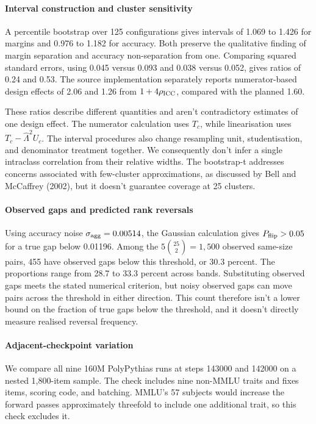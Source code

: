 \paragraph{Interval construction and cluster sensitivity}
A percentile bootstrap over 125 configurations gives intervals of 1.069 to 1.426 for margins and 0.976 to 1.182 for accuracy. Both preserve the qualitative finding of margin separation and accuracy non-separation from one. Comparing squared standard errors, using 0.045 versus 0.093 and 0.038 versus 0.052, gives ratios of 0.24 and 0.53. The source implementation separately reports numerator-based design effects of 2.06 and 1.26 from $1+4\rho_{\rm ICC}$, compared with the planned 1.60.

These ratios describe different quantities and aren't contradictory estimates of one design effect. The numerator calculation uses $T_c$, while linearisation uses $T_c-\widehat\Lambda^2U_c$. The interval procedures also change resampling unit, studentisation, and denominator treatment together. We consequently don't infer a single intraclass correlation from their relative widths. The bootstrap-t addresses concerns associated with few-cluster approximations, as discussed by Bell and McCaffrey (2002), but it doesn't guarantee coverage at 25 clusters.

\paragraph{Observed gaps and predicted rank reversals}
Using accuracy noise $\sigma_{\rm agg}=0.00514$, the Gaussian calculation gives $P_{\rm flip}>0.05$ for a true gap below 0.01196. Among the $5\binom{25}{2}=1{,}500$ observed same-size pairs, 455 have observed gaps below this threshold, or 30.3 percent. The proportions range from 28.7 to 33.3 percent across bands. Substituting observed gaps meets the stated numerical criterion, but noisy observed gaps can move pairs across the threshold in either direction. This count therefore isn't a lower bound on the fraction of true gaps below the threshold, and it doesn't directly measure realised reversal frequency.

\paragraph{Adjacent-checkpoint variation}
We compare all nine 160M PolyPythias runs at steps 143000 and 142000 on a nested 1,800-item sample. The check includes nine non-MMLU traits and fixes items, scoring code, and batching. MMLU's 57 subjects would increase the forward passes approximately threefold to include one additional trait, so this check excludes it.

